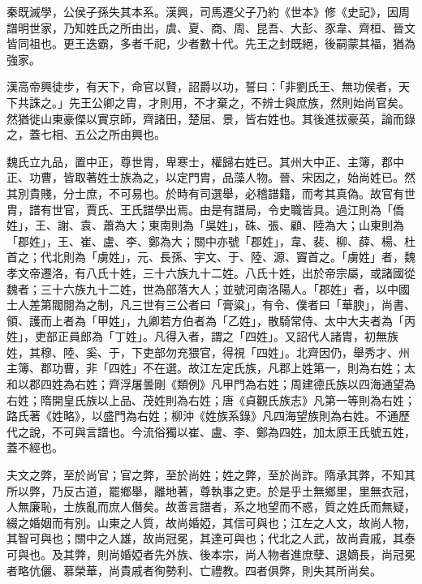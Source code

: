 \begin{pinyinscope}
 秦既滅學，公侯子孫失其本系。漢興，司馬遷父子乃約《世本》修《史記》，因周譜明世家，乃知姓氏之所由出，虞、夏、商、周、昆吾、大彭、豕韋、齊桓、晉文皆同祖也。更王迭霸，多者千祀，少者數十代。先王之封既絕，後嗣蒙其福，猶為強家。



 漢高帝興徒步，有天下，命官以賢，詔爵以功，誓曰：「非劉氏王、無功侯者，天下共誅之。」先王公卿之胄，才則用，不才棄之，不辨士與庶族，然則始尚官矣。然猶徙山東豪傑以實京師，齊諸田，楚屈、景，皆右姓也。其後進拔豪英，論而錄之，蓋七相、五公之所由興也。



 魏氏立九品，置中正，尊世胄，卑寒士，權歸右姓已。其州大中正、主簿，郡中正、功曹，皆取著姓士族為之，以定門胄，品藻人物。晉、宋因之，始尚姓已。然其別貴賤，分士庶，不可易也。於時有司選舉，必稽譜籍，而考其真偽。故官有世胄，譜有世官，賈氏、王氏譜學出焉。由是有譜局，令史職皆具。過江則為「僑姓」，王、謝、袁、蕭為大；東南則為「吳姓」，硃、張、顧、陸為大；山東則為「郡姓」，王、崔、盧、李、鄭為大；關中亦號「郡姓」，韋、裴、柳、薛、楊、杜首之；代北則為「虜姓」，元、長孫、宇文、于、陸、源、竇首之。「虜姓」者，魏孝文帝遷洛，有八氏十姓，三十六族九十二姓。八氏十姓，出於帝宗屬，或諸國從魏者；三十六族九十二姓，世為部落大人；並號河南洛陽人。「郡姓」者，以中國士人差第閥閱為之制，凡三世有三公者曰「膏粱」，有令、僕者曰「華腴」，尚書、領、護而上者為「甲姓」，九卿若方伯者為「乙姓」，散騎常侍、太中大夫者為「丙姓」，吏部正員郎為「丁姓」。凡得入者，謂之「四姓」。又詔代人諸胄，初無族姓，其穆、陸、奚、于，下吏部勿充猥官，得視「四姓」。北齊因仍，舉秀才、州主簿、郡功曹，非「四姓」不在選。故江左定氏族，凡郡上姓第一，則為右姓；太和以郡四姓為右姓；齊浮屠曇剛《類例》凡甲門為右姓；周建德氏族以四海通望為右姓；隋開皇氏族以上品、茂姓則為右姓；唐《貞觀氏族志》凡第一等則為右姓；路氏著《姓略》，以盛門為右姓；柳沖《姓族系錄》凡四海望族則為右姓。不通歷代之說，不可與言譜也。今流俗獨以崔、盧、李、鄭為四姓，加太原王氏號五姓，蓋不經也。



 夫文之弊，至於尚官；官之弊，至於尚姓；姓之弊，至於尚詐。隋承其弊，不知其所以弊，乃反古道，罷鄉舉，離地著，尊執事之吏。於是乎土無鄉里，里無衣冠，人無廉恥，士族亂而庶人僭矣。故善言譜者，系之地望而不惑，質之姓氏而無疑，綴之婚姻而有別。山東之人質，故尚婚婭，其信可與也；江左之人文，故尚人物，其智可與也；關中之人雄，故尚冠冕，其達可與也；代北之人武，故尚貴戚，其泰可與也。及其弊，則尚婚婭者先外族、後本宗，尚人物者進庶孽、退嫡長，尚冠冕者略伉儷、慕榮華，尚貴戚者徇勢利、亡禮教。四者俱弊，則失其所尚矣。




\end{pinyinscope}
